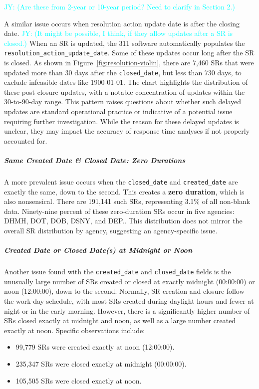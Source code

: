 \documentclass[linenumber]{jdsart}
\newcommand{\jy}[1]{\textcolor{cyan}{JY: (#1)}}
\begin{document}
\jy{Are these from 2-year or 10-year period? Need to clarify in
  Section 2.}

A similar issue occurs when resolution action update date is after the
closing date. \jy{It might be possible, I think, if they allow updates
  after a SR is closed.}
When an SR is updated, the 311 software automatically populates the 
\texttt{resolution\_action\_update\_date}. Some of these updates 
occur long after the SR is closed. As shown in Figure~\ref{fig:resolution-violin}, 
there are 7,460 SRs that were updated more than 30 days after the 
\texttt{closed\_date}, but less than 730 days, to exclude infeasible 
dates like 1900-01-01. The chart highlights the distribution of these 
post-closure updates, with a notable concentration of updates within 
the 30-to-90-day range. This pattern raises questions about whether 
such delayed updates are standard operational practice or indicative 
of a potential issue requiring further investigation. While the reason 
for these delayed updates is unclear, they may impact the accuracy of 
response time analyses if not properly accounted for.
	
\subparagraph{Same Created Date \& Closed Date: Zero Durations}
A more prevalent issue occurs when the \texttt{closed\_date} and 
\texttt{created\_date} are exactly the same, down to the second. This 
creates a \textbf{zero duration}, which is also nonsensical. There 
are 191,141 such SRs, representing 3.1\% of all non-blank data. 
Ninety-nine percent of these zero-duration SRs occur in five agencies:
DHMH, DOT, DOB, DSNY, and DEP.. 
This distribution does not mirror the overall SR distribution by 
agency, suggesting an agency-specific issue.
	
		

\subparagraph{Created Date or Closed Date(s) at Midnight or Noon}
Another issue found with the \texttt{created\_date} and 
\texttt{closed\_date} fields is the unusually large number of SRs 
created or closed at exactly midnight (00:00:00) or noon (12:00:00), 
down to the second. Normally, SR creation and closure follow the 
work-day schedule, with most SRs created during daylight hours and 
fewer at night or in the early morning. However, there is a 
significantly higher number of SRs closed exactly at midnight and noon, 
as well as a large number created exactly at noon. Specific observations 
include:
\begin{itemize}
    \item 99,779 SRs were created exactly at noon (12:00:00).
    \item 235,347 SRs were closed exactly at midnight (00:00:00).
    \item 105,505 SRs were closed exactly at noon.
\end{itemize}
\end{document}
